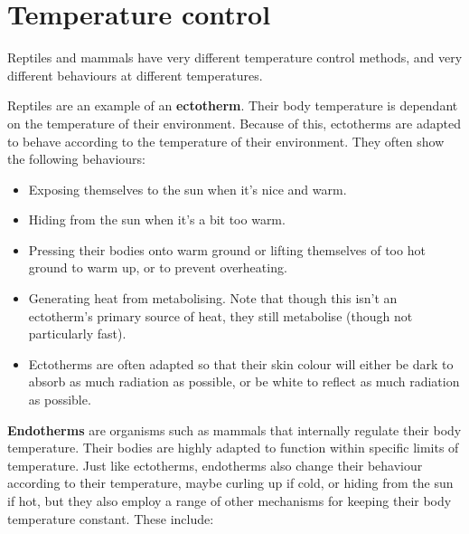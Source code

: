 \documentclass{article}
\begin{document}
\section*{Temperature control}

Reptiles and mammals have very different temperature control methods, and very
different behaviours at different temperatures.

Reptiles are an example of an {\bf ectotherm}. Their body temperature is dependant on the temperature of their environment. Because of this, ectotherms are adapted to behave according to the temperature of their environment. They often show the following behaviours:

\begin{itemize}

	\item Exposing themselves to the sun when it's nice and warm.

	\item Hiding from the sun when it's a bit too warm.

	\item Pressing their bodies onto warm ground or lifting themselves of too
	hot ground to warm up, or to prevent overheating.

	\item Generating heat from metabolising. Note that though this isn't an
	ectotherm's primary source of heat, they still metabolise (though not
	particularly fast).

	\item Ectotherms are often adapted so that their skin colour will either be
	dark to absorb as much radiation as possible, or be white to reflect as
	much radiation as possible.

\end{itemize}

{\bf Endotherms} are organisms such as mammals that internally regulate their
body temperature. Their bodies are highly adapted to function within specific
limits of temperature. Just like ectotherms, endotherms also change their
behaviour according to their temperature, maybe curling up if cold, or hiding
from the sun if hot, but they also employ a range of other mechanisms for
keeping their body temperature constant. These include:
\end{document}
